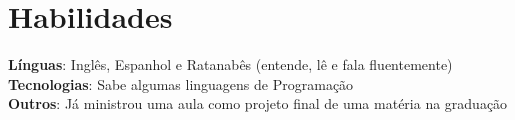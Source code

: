 \section{Habilidades}
    \begin{itemize}[leftmargin=0.15in, label={}]
	\small{\item{
		\textbf{Línguas}{: Inglês, Espanhol e Ratanabês (entende, lê e fala fluentemente)} \\
		\textbf{Tecnologias}{: Sabe algumas linguagens de Programação} \\
		\textbf{Outros}{: Já ministrou uma aula como projeto final de uma matéria na graduação}
	}}
    \end{itemize}
